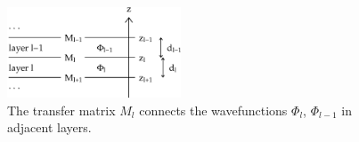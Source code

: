 \begin{figure}[tb]
\begin{center}
\includegraphics[width=0.46\textwidth]{fig/drawing/multilayer_boundary.ps}
\end{center}
\caption{The transfer matrix $M_l$ connects the wavefunctions
%
%
%
$\Phi_l$, $\Phi_{l-1}$ in adjacent layers.}
\label{Fboundary}
\end{figure}

